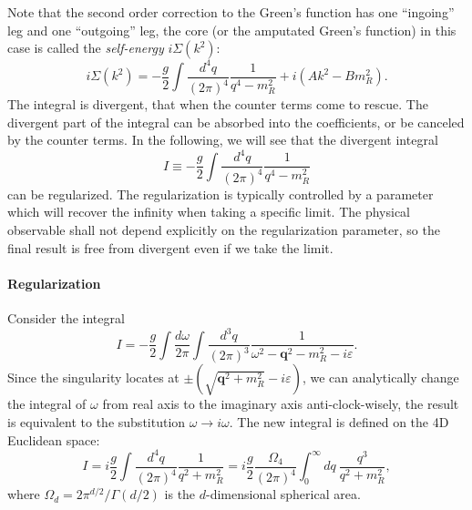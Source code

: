 \documentclass[aps,prb,superscriptaddress,nofootinbib]{revtex4}
\begin{document}
Note that the second order correction to the Green's function has one ``ingoing'' leg and one ``outgoing'' leg, the core (or the amputated Green's function) in this case is called the \textit{self-energy} $i\Sigma(k^2)$:
\begin{equation}
	i\Sigma(k^2) = -\frac{g}{2}\int \frac{d^4 q}{(2\pi)^4} \frac{1}{q^4-m_R^2} + i(Ak^2-Bm_R^2).
\end{equation}
The integral is divergent, that when the counter terms come to rescue.
The divergent part of the integral can be absorbed into the coefficients, or be canceled by the counter terms.
In the following, we will see that the divergent integral
\begin{equation}
	I \equiv -\frac{g}{2} \int \frac{d^4 q}{(2\pi)^4} \frac{1}{q^4-m_R^2}
\end{equation}
can be regularized.
The regularization is typically controlled by a parameter which will recover the infinity when taking a specific limit.
The physical observable shall not depend explicitly on the regularization parameter, so the final result is free from divergent even if we take the limit.


\paragraph*{Regularization}
Consider the integral
\begin{equation}
	I = -\frac{g}{2} \int\frac{d \omega}{2\pi} \int\frac{d^3 q}{(2\pi)^3} \frac{1}{\omega^2 - \bm q^2-m_R^2 -i\varepsilon}.
\end{equation}
Since the singularity locates at $\pm(\sqrt{\bm q^2+m_R^2}-i\varepsilon)$, we can analytically change the integral of $\omega$ from real axis to the imaginary axis anti-clock-wisely, the result is equivalent to the substitution $\omega \rightarrow i\omega$.
The new integral is defined on the 4D Euclidean space:
\begin{equation}
	I = i \frac{g}{2} \int \frac{d^4 q}{(2\pi)^4} \frac{1}{q^2 + m_R^2}
	= i\frac{g}{2} \frac{\Omega_4}{(2\pi)^4} \int_0^\infty dq \ \frac{q^3}{q^2 + m^2_R},
\end{equation}
where $\Omega_d = 2 \pi^{d/2}/\Gamma\left(d/2\right)$ is the $d$-dimensional spherical area.
\end{document}
